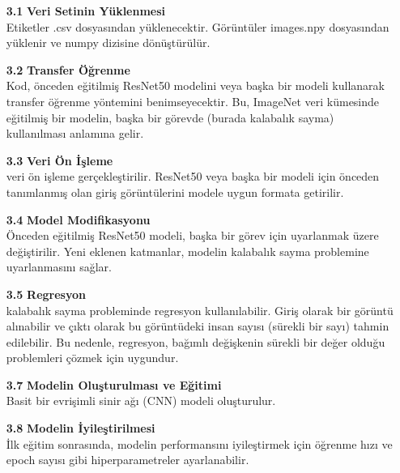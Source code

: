 \documentclass[10pt,a4paper]{report}
\begin{document}
		\begin{enumerate}
			
		\item[\textbf{3.1}] \textbf{Veri Setinin Yüklenmesi} \\
				Etiketler .csv dosyasından yüklenecektir.
				Görüntüler images.npy dosyasından yüklenir ve numpy dizisine dönüştürülür.
		
		 	\item[\textbf{3.2}] \textbf{Transfer Öğrenme} \\
		Kod, önceden eğitilmiş ResNet50 modelini veya başka bir modeli kullanarak transfer öğrenme yöntemini benimseyecektir. Bu, ImageNet veri kümesinde eğitilmiş bir modelin, başka bir görevde (burada kalabalık sayma) kullanılması anlamına gelir.
		
		 	\item[\textbf{3.3}] \textbf{Veri Ön İşleme} \\
		veri ön işleme gerçekleştirilir. ResNet50 veya başka bir modeli için önceden tanımlanmış olan giriş görüntülerini modele uygun formata getirilir.
		
	\item[\textbf{3.4}] \textbf{Model Modifikasyonu} \\
		Önceden eğitilmiş ResNet50 modeli, başka bir görev için uyarlanmak üzere değiştirilir. Yeni eklenen katmanlar, modelin kalabalık sayma problemine uyarlanmasını sağlar.
		
	\item[\textbf{3.5}] \textbf{Regresyon} \\
		kalabalık sayma probleminde regresyon kullanılabilir. Giriş olarak bir görüntü alınabilir ve çıktı olarak bu görüntüdeki insan sayısı (sürekli bir sayı) tahmin edilebilir. Bu nedenle, regresyon, bağımlı değişkenin sürekli bir değer olduğu problemleri çözmek için uygundur.
		
		
	\item[\textbf{3.7}] \textbf{Modelin Oluşturulması ve Eğitimi} \\
		Basit bir evrişimli sinir ağı (CNN) modeli oluşturulur.        
		
	\item[\textbf{3.8}] \textbf{Modelin İyileştirilmesi} \\
		İlk eğitim sonrasında, modelin performansını iyileştirmek için öğrenme hızı ve epoch sayısı gibi hiperparametreler ayarlanabilir.
		

\end{enumerate}
\end{document}
